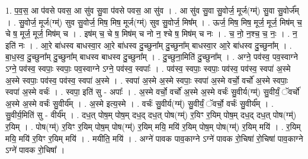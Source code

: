 \documentclass[17pt]{extarticle}
\begin{document}
1. प॒व॒स॒ आ प॑वसे पवस॒ आ सु॑व सु॒वा प॑वसे पवस॒ आ सु॑व । . आ सु॑व सु॒वा सु॒वोर्ज॒ मूर्ज(ग्म्॑) सु॒वा सु॒वोर्ज᳚म् । . सु॒वोर्ज॒ मूर्ज(ग्म्॑) सुव सु॒वोर्ज॒ मिष॒ मिष॒ मूर्ज(ग्म्॑) सुव सु॒वोर्ज॒ मिष᳚म् । . ऊर्ज॒ मिष॒ मिष॒ मूर्ज॒ मूर्ज॒ मिष॑म् च॒ चे ष॒ मूर्ज॒ मूर्ज॒ मिष॑म् च । . इष॑म् च॒ चे ष॒ मिष॑म् च नो न॒ श्चे ष॒ मिष॑म् च नः । . च॒ नो॒ न॒श्च॒ च॒ नः॒ । . न॒ इति॑ नः । . आ॒रे बा॑धस्व बाधस्वा॒र आ॒रे बा॑धस्व दु॒च्छुना᳚म् दु॒च्छुना᳚म् बाधस्वा॒र आ॒रे बा॑धस्व दु॒च्छुना᳚म् । . बा॒ध॒स्व॒ दु॒च्छुना᳚म् दु॒च्छुना᳚म् बाधस्व बाधस्व दु॒च्छुना᳚म् । . दु॒च्छुना॒मिति॑ दु॒च्छुना᳚म् । . अग्ने॒ पव॑स्व॒ पव॒स्वाग्ने ऽग्ने॒ पव॑स्व॒ स्वपाः॒ स्वपाः॒ पव॒स्वाग्ने ऽग्ने॒ पव॑स्व॒ स्वपाः᳚ । . पव॑स्व॒ स्वपाः॒ स्वपाः॒ पव॑स्व॒ पव॑स्व॒ स्वपा॑ अ॒स्मे अ॒स्मे स्वपाः॒ पव॑स्व॒ पव॑स्व॒ स्वपा॑ अ॒स्मे । . स्वपा॑ अ॒स्मे अ॒स्मे स्वपाः॒ स्वपा॑ अ॒स्मे वर्चो॒ वर्चो॑ अ॒स्मे स्वपाः॒ स्वपा॑ अ॒स्मे वर्चः॑ । . स्वपा॒ इति॑ सु - अपाः᳚ । . अ॒स्मे वर्चो॒ वर्चो॑ अ॒स्मे अ॒स्मे वर्चः॑ सु॒वीर्य(ग्म्॑) सु॒वीर्यं॒ ॅवर्चो॑ अ॒स्मे अ॒स्मे वर्चः॑ सु॒वीर्य᳚म् । . अ॒स्मे इत्य॒स्मे । . वर्चः॑ सु॒वीर्य(ग्म्॑) सु॒वीर्यं॒ ॅवर्चो॒ वर्चः॑ सु॒वीर्य᳚म् । . सु॒वीर्य॒मिति॑ सु - वीर्य᳚म् । . दध॒त् पोष॒म् पोष॒म् दध॒द् दध॒त् पोष(ग्म्॑) र॒यिꣳ र॒यिम् पोष॒म् दध॒द् दध॒त् पोष(ग्म्॑) र॒यिम् । . पोष(ग्म्॑) र॒यिꣳ र॒यिम् पोष॒म् पोष(ग्म्॑) र॒यिम् मयि॒ मयि॑ र॒यिम् पोष॒म् पोष(ग्म्॑) र॒यिम् मयि॑ । . र॒यिम् मयि॒ मयि॑ र॒यिꣳ र॒यिम् मयि॑ । . मयीति॒ मयि॑ । . अग्ने॑ पावक पाव॒काग्ने ऽग्ने॑ पावक रो॒चिषा॑ रो॒चिषा॑ पाव॒काग्ने ऽग्ने॑ पावक रो॒चिषा᳚ । \newline
\end{document}
